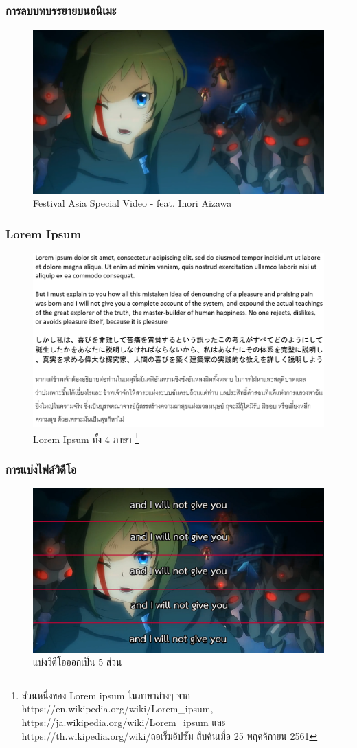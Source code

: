 \documentclass[xcolor=dvipsnames, xetex,serif]{beamer}
\numberwithin{equation}{section}
\begin{document}
    \begin{frame}
        \frametitle{การลบบทบรรยายบนอนิเมะ}
        \begin{figure}[H]
            \centering
            \includegraphics[width=0.8\linewidth]{images/inori-preview.png}
            \caption{ Festival Asia Special Video - feat. Inori Aizawa }
        \end{figure}
    \end{frame}
    \begin{frame}
        \frametitle{Lorem Ipsum}
            \begin{figure}[H]
            \centering
            \includegraphics[width=0.85\linewidth]{images/lorem4lang.png}
            \caption{Lorem Ipsum ทั้ง 4 ภาษา \footnote{ \tiny{ส่วนหนึ่งของ Lorem ipsum  ในภาษาต่างๆ จาก https://en.wikipedia.org/wiki/Lorem\_ipsum,  https://ja.wikipedia.org/wiki/Lorem\_ipsum และ  https://th.wikipedia.org/wiki/ลอเร็มอิปซัม สืบค้นเมื่อ 25 พฤศจิกายน 2561} } }
        \end{figure}
    \end{frame}
    \begin{frame}
        \frametitle{การแบ่งไฟล์วิดีโอ}
            \begin{figure}[H]
            \centering
            \includegraphics[width=0.8\linewidth]{images/inori-subbed-preview.png}
            \caption{แบ่งวิดีโอออกเป็น 5 ส่วน}
        \end{figure}
    \end{frame}
\end{document}
